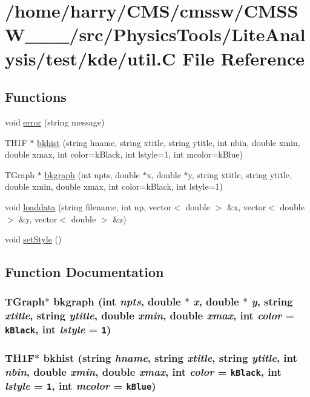 \hypertarget{util_8C}{
\section{/home/harry/CMS/cmssw/CMSSW\_\_\_/src/Physics\-Tools/Lite\-Analysis/test/kde/util.C File Reference}
\label{util_8C}
}


\subsection*{Functions}
\begin{CompactItemize}
\item 
void \hyperlink{util_8C_a0}{error} (string message)
\item 
TH1F $\ast$ \hyperlink{util_8C_a1}{bkhist} (string hname, string xtitle, string ytitle, int nbin, double xmin, double xmax, int color=k\-Black, int lstyle=1, int mcolor=k\-Blue)
\item 
TGraph $\ast$ \hyperlink{util_8C_a2}{bkgraph} (int npts, double $\ast$x, double $\ast$y, string xtitle, string ytitle, double xmin, double xmax, int color=k\-Black, int lstyle=1)
\item 
void \hyperlink{util_8C_a3}{loaddata} (string filename, int np, vector$<$ double $>$ \&x, vector$<$ double $>$ \&y, vector$<$ double $>$ \&z)
\item 
void \hyperlink{util_8C_a4}{set\-Style} ()
\end{CompactItemize}


\subsection{Function Documentation}
\hypertarget{util_8C_a2}{
\subsubsection[bkgraph]{\setlength{\rightskip}{0pt plus 5cm}TGraph$\ast$ bkgraph (int {\em npts}, double $\ast$ {\em x}, double $\ast$ {\em y}, string {\em xtitle}, string {\em ytitle}, double {\em xmin}, double {\em xmax}, int {\em color} = {\tt kBlack}, int {\em lstyle} = {\tt 1})}}
\label{util_8C_a2}


\hypertarget{util_8C_a1}{
\subsubsection[bkhist]{\setlength{\rightskip}{0pt plus 5cm}TH1F$\ast$ bkhist (string {\em hname}, string {\em xtitle}, string {\em ytitle}, int {\em nbin}, double {\em xmin}, double {\em xmax}, int {\em color} = {\tt kBlack}, int {\em lstyle} = {\tt 1}, int {\em mcolor} = {\tt kBlue})}}
\label{util_8C_a1}


